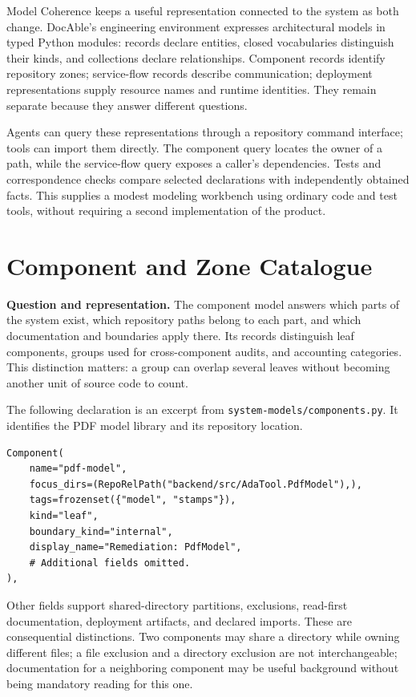 
Model Coherence keeps a useful representation connected to the system as both change. DocAble's engineering environment expresses architectural models in typed Python modules: records declare entities, closed vocabularies distinguish their kinds, and collections declare relationships. Component records identify repository zones; service-flow records describe communication; deployment representations supply resource names and runtime identities. They remain separate because they answer different questions.

Agents can query these representations through a repository command interface; tools can import them directly. The component query locates the owner of a path, while the service-flow query exposes a caller's dependencies. Tests and correspondence checks compare selected declarations with independently obtained facts. This supplies a modest modeling workbench using ordinary code and test tools, without requiring a second implementation of the product.

\section{Component and Zone Catalogue}\label{heading:handbook-model-component-zones}

\textbf{Question and representation.} The component model answers which parts of the system exist, which repository paths belong to each part, and which documentation and boundaries apply there. Its records distinguish leaf components, groups used for cross-component audits, and accounting categories. This distinction matters: a group can overlap several leaves without becoming another unit of source code to count.

The following declaration is an excerpt from \texttt{system-models/components.py}. It identifies the PDF model library and its repository location.

\begin{verbatim}
Component(
    name="pdf-model",
    focus_dirs=(RepoRelPath("backend/src/AdaTool.PdfModel"),),
    tags=frozenset({"model", "stamps"}),
    kind="leaf",
    boundary_kind="internal",
    display_name="Remediation: PdfModel",
    # Additional fields omitted.
),
\end{verbatim}

Other fields support shared-directory partitions, exclusions, read-first documentation, deployment artifacts, and declared imports. These are consequential distinctions. Two components may share a directory while owning different files; a file exclusion and a directory exclusion are not interchangeable; documentation for a neighboring component may be useful background without being mandatory reading for this one.

